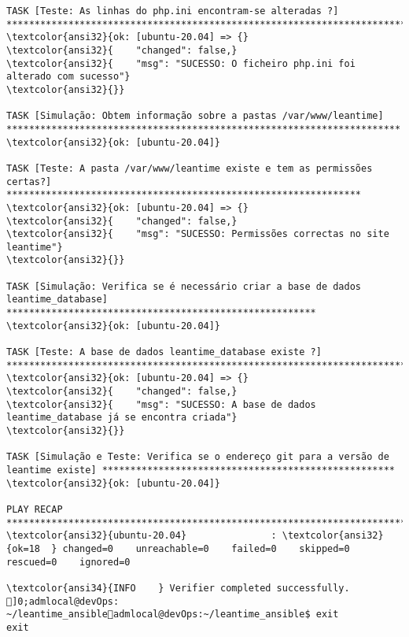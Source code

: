 \documentclass{scrartcl}
\begin{document}
\begin{Verbatim}
TASK [Teste: As linhas do php.ini encontram-se alteradas ?] ******************************************************************************
\textcolor{ansi32}{ok: [ubuntu-20.04] => {}
\textcolor{ansi32}{    "changed": false,}
\textcolor{ansi32}{    "msg": "SUCESSO: O ficheiro php.ini foi alterado com sucesso"}
\textcolor{ansi32}{}}

TASK [Simulação: Obtem informação sobre a pastas /var/www/leantime] **********************************************************************
\textcolor{ansi32}{ok: [ubuntu-20.04]}

TASK [Teste: A pasta /var/www/leantime existe e tem as permissões certas?] ***************************************************************
\textcolor{ansi32}{ok: [ubuntu-20.04] => {}
\textcolor{ansi32}{    "changed": false,}
\textcolor{ansi32}{    "msg": "SUCESSO: Permissões correctas no site leantime"}
\textcolor{ansi32}{}}

TASK [Simulação: Verifica se é necessário criar a base de dados leantime_database] *******************************************************
\textcolor{ansi32}{ok: [ubuntu-20.04]}

TASK [Teste: A base de dados leantime_database existe ?] *********************************************************************************
\textcolor{ansi32}{ok: [ubuntu-20.04] => {}
\textcolor{ansi32}{    "changed": false,}
\textcolor{ansi32}{    "msg": "SUCESSO: A base de dados leantime_database já se encontra criada"}
\textcolor{ansi32}{}}

TASK [Simulação e Teste: Verifica se o endereço git para a versão de leantime existe] ****************************************************
\textcolor{ansi32}{ok: [ubuntu-20.04]}

PLAY RECAP *******************************************************************************************************************************
\textcolor{ansi32}{ubuntu-20.04}               : \textcolor{ansi32}{ok=18  } changed=0    unreachable=0    failed=0    skipped=0    rescued=0    ignored=0

\textcolor{ansi34}{INFO    } Verifier completed successfully.
]0;admlocal@devOps: ~/leantime_ansibleadmlocal@devOps:~/leantime_ansible$ exit
exit

\end{Verbatim}
\end{document}
